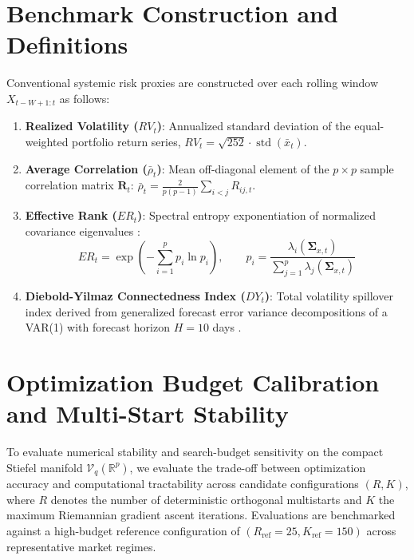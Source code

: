 \documentclass[review,12pt,authoryear]{elsarticle}
\begin{document}
\section{Benchmark Construction and Definitions}
\label{app:benchmarks}
Conventional systemic risk proxies are constructed over each rolling window $X_{t-W+1:t}$ as follows:
\begin{enumerate}
    \item \textbf{Realized Volatility ($RV_t$)}: Annualized standard deviation of the equal-weighted portfolio return series, $RV_t = \sqrt{252} \cdot \operatorname{std}(\bar{x}_t)$.
    \item \textbf{Average Correlation ($\bar{\rho}_t$)}: Mean off-diagonal element of the $p \times p$ sample correlation matrix $\mathbf{R}_t$: $\bar{\rho}_t = \frac{2}{p(p-1)} \sum_{i < j} R_{ij,t}$.
    \item \textbf{Effective Rank ($ER_t$)}: Spectral entropy exponentiation of normalized covariance eigenvalues \citep{roy2007effective}:
    \begin{equation}
    ER_t = \exp\left( -\sum_{i=1}^p p_i \ln p_i \right), \qquad p_i = \frac{\lambda_i(\boldsymbol{\Sigma}_{x,t})}{\sum_{j=1}^p \lambda_j(\boldsymbol{\Sigma}_{x,t})}
    \end{equation}
    \item \textbf{Diebold-Yilmaz Connectedness Index ($DY_t$)}: Total volatility spillover index derived from generalized forecast error variance decompositions of a VAR(1) with forecast horizon $H = 10$ days \citep{diebold2012better}.
\end{enumerate}

\section{Optimization Budget Calibration and Multi-Start Stability}
\label{app:optimizer_calibration}

To evaluate numerical stability and search-budget sensitivity on the compact Stiefel manifold $\mathcal{V}_q(\mathbb{R}^p)$, we evaluate the trade-off between optimization accuracy and computational tractability across candidate configurations $(R, K)$, where $R$ denotes the number of deterministic orthogonal multistarts and $K$ the maximum Riemannian gradient ascent iterations. Evaluations are benchmarked against a high-budget reference configuration of $(R_{\mathrm{ref}}=25, K_{\mathrm{ref}}=150)$ across representative market regimes.
\end{document}
